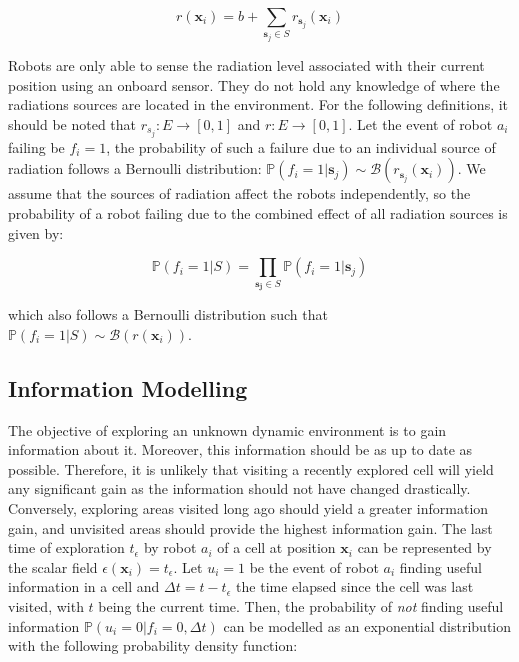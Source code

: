 \documentclass[letterpaper, 10 pt, conference]{ieeeconf}
\begin{document}
\begin{equation}
    r(\bm{x}_i) = b + \sum_{\bm{s}_j \in S} r_{\bm{s}_j}(\bm{x}_i)
\end{equation}

Robots are only able to sense the radiation level associated with
their current position using an onboard sensor. They do not hold any
knowledge of where the radiations sources are located in the
environment. For the following definitions, it should be noted that
$r_{s_j}: E \rightarrow [0, 1]$ and $r: E \rightarrow [0, 1]$.  Let
the event of robot $a_i$ failing be $f_i=1$, the probability of such a
failure due to an individual source of radiation follows a Bernoulli
distribution:
$\mathbb{P}(f_i = 1 | \bm{s}_j) \sim
\mathcal{B}(r_{\bm{s}_j}(\bm{x}_i))$. We assume that the sources of
radiation affect the robots independently, so the probability of a
robot failing due to the combined effect of all radiation sources is
given by:

\begin{equation}
    \mathbb{P}(f_i = 1 | S) = \prod_{\bm{s_j} \in S} \mathbb{P}(f_i = 1 | \bm{s}_j)
    \label{eq:failure}
\end{equation}

which also follows a Bernoulli distribution such that
$\mathbb{P}(f_i = 1 | S) \sim \mathcal{B}(r(\bm{x}_i))$.

\subsection{Information Modelling}
The objective of exploring an unknown dynamic environment is to gain
information about it. Moreover, this information should be as up to
date as possible. Therefore, it is unlikely that visiting a recently
explored cell will yield any significant gain as the information
should not have changed drastically. Conversely, exploring areas
visited long ago should yield a greater information gain, and
unvisited areas should provide the highest information gain. The last
time of exploration $t_\epsilon$ by robot $a_i$ of a cell at position
$\bm{x}_i$ can be represented by the scalar field
$\epsilon(\bm{x}_i) = t_\epsilon$. Let $u_i=1$ be the event of robot
$a_i$ finding useful information in a cell and
$\Delta t = t-t_\epsilon$ the time elapsed since the cell was last
visited, with $t$ being the current time. Then, the probability of
\textit{not} finding useful information
$\mathbb{P}(u_i=0 | f_i=0, \Delta t)$ can be modelled as an
exponential distribution with the following probability density
function:
\end{document}
